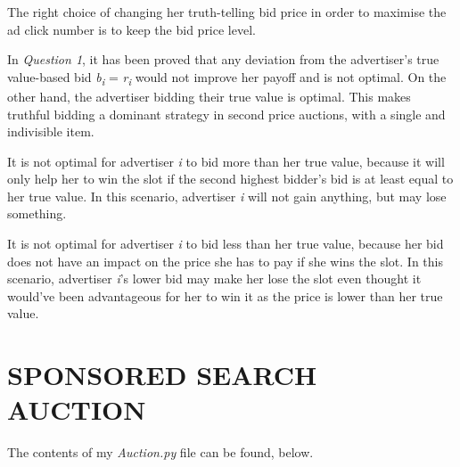 \documentclass{article} %
\begin{document}
The right choice of changing her truth-telling bid price in order to maximise the ad click number is to keep the bid price level.

In \textit{Question 1}, it has been proved that any deviation from the advertiser's true value-based bid \textit{b\textsubscript{i}} = \textit{r\textsubscript{i}} would not improve her payoff and is not optimal. On the other hand, the advertiser bidding their true value is optimal. This makes truthful bidding a dominant strategy in second price auctions, with a single and indivisible item.

It is not optimal for advertiser \textit{i} to bid more than her true value, because it will only help her to win the slot if the second highest bidder's bid is at least equal to her true value. In this scenario, advertiser \textit{i} will not gain anything, but may lose something.

It is not optimal for advertiser \textit{i} to bid less than her true value, because her bid does not have an impact on the price she has to pay if she wins the slot. In this scenario, advertiser \textit{i}'s lower bid may make her lose the slot even thought it would've been advantageous for her to win it as the price is lower than her true value.

\section{SPONSORED SEARCH AUCTION \cite{easley2010networks} \cite{easley2010networks1}}

The contents of my \textit{Auction.py} file can be found, below.
\end{document}

